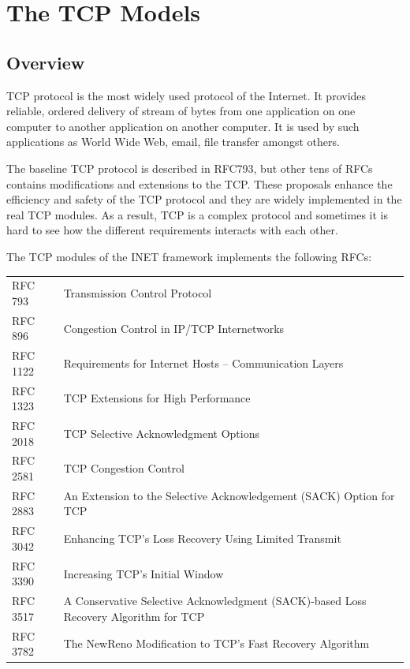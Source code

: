 \chapter{The TCP Models}
\label{cha:tcp}


\section{Overview}

TCP protocol is the most widely used protocol of the Internet. It provides
reliable, ordered delivery of stream of bytes from one application on one computer
to another application on another computer. It is used by such applications as
World Wide Web, email, file transfer amongst others.

The baseline TCP protocol is described in RFC793, but other tens of RFCs
contains modifications and extensions to the TCP. These proposals
enhance the efficiency and safety of the TCP protocol and they are widely
implemented in the real TCP modules. As a result, TCP is a complex protocol
and sometimes it is hard to see how the different requirements interacts
with each other.

The TCP modules of the INET framework implements the following RFCs:

\begin{tabular}{ll}
RFC 793 & Transmission Control Protocol \\
RFC 896 & Congestion Control in IP/TCP Internetworks \\
RFC 1122 & Requirements for Internet Hosts -- Communication Layers \\
RFC 1323 & TCP Extensions for High Performance \\
RFC 2018 & TCP Selective Acknowledgment Options \\
RFC 2581 & TCP Congestion Control \\
RFC 2883 & An Extension to the Selective Acknowledgement (SACK) Option for TCP \\
RFC 3042 & Enhancing TCP's Loss Recovery Using Limited Transmit \\
RFC 3390 & Increasing TCP's Initial Window \\
RFC 3517 & A Conservative Selective Acknowledgment (SACK)-based Loss Recovery \newline
                 Algorithm for TCP \\
RFC 3782 & The NewReno Modification to TCP's Fast Recovery Algorithm \\
\end{tabular}

